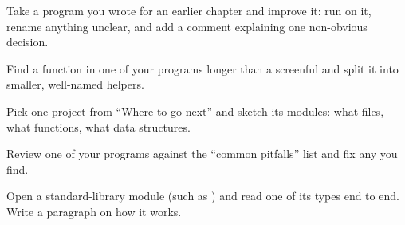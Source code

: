 \exercise Take a program you wrote for an earlier chapter and improve it: run
 on it, rename anything unclear, and add a comment explaining one
non-obvious decision.

\exercise Find a function in one of your programs longer than a screenful and split
it into smaller, well-named helpers.

\exercise Pick one project from ``Where to go next'' and sketch its modules: what
files, what  functions, what data structures.

\exercise Review one of your programs against the ``common pitfalls'' list and fix
any you find.

\exercise Open a standard-library module (such as ) and read one
of its types end to end. Write a paragraph on how it works.
